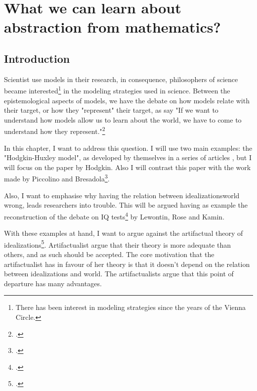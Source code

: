 



    \dochaptoc

\chapter{What we can learn about abstraction from mathematics?}
\label{ch:wwlmath}

\section{Introduction}

Scientist use models in their research, in consequence, philosophers of science became interested\footnote{There has been interest in modeling strategies since the years of the Vienna Circle.} in the modeling strategies used in science.
Between the epistemological aspects of models, we have the debate on how models relate with their target, or how they "represent" their target, as \citeauthor{Frigg2020} say "If we want to understand how models allow us to learn about the world, we have to come to understand how they represent."\footcite[][p. x]{Frigg2020}

In this chapter, I want to address this question.
I will use two main examples: the "Hodgkin-Huxley model", as developed by themselves in a series of articles \parencite{Hodgkin1951, Hodgkin1952, Hodgkin1952a, Hodgkin1952b}, but I will focus on the paper  by Hodgkin.
Also I will contrast this paper with the work made by Piccolino and Bresadola\footcite{Piccolino2013}.

Also, I want to emphasise why having the relation between idealizations\/world wrong, leads researchers into trouble.
This will be argued having as example the reconstruction of the debate on IQ tests\footcite{Lewontin2017} by Lewontin, Rose and Kamin.

With these examples at hand, I want to argue against the artifactual theory of idealizations\footcite{Carrillo2021-CARAAP-12, Carrillo2022}.
Artifactualist argue that their theory is more adequate than others, and as such should be accepted.
The core motivation that the artifactualist has in favour of her theory is that it doesn't depend on the relation between idealizations and world.
The artifactualists argue that this point of departure has many advantages.

